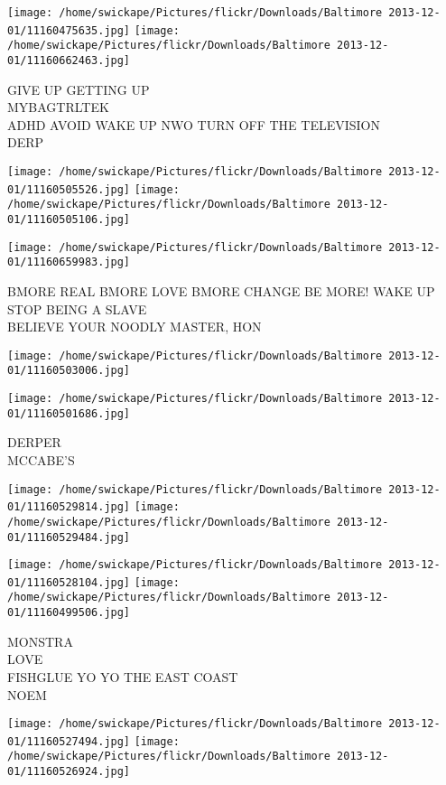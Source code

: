 \documentclass[10pt,letterpaper]{article}
\begin{document}
\texttt{[image: /home/swickape/Pictures/flickr/Downloads/Baltimore 2013-12-01/11160475635.jpg]}
\texttt{[image: /home/swickape/Pictures/flickr/Downloads/Baltimore 2013-12-01/11160662463.jpg]}

GIVE UP GETTING UP\\
MYBAGTRLTEK\\
ADHD AVOID WAKE UP NWO TURN OFF THE TELEVISION\\
DERP
\pagebreak

\texttt{[image: /home/swickape/Pictures/flickr/Downloads/Baltimore 2013-12-01/11160505526.jpg]}
\texttt{[image: /home/swickape/Pictures/flickr/Downloads/Baltimore 2013-12-01/11160505106.jpg]}

\vspace{0.25in}
\texttt{[image: /home/swickape/Pictures/flickr/Downloads/Baltimore 2013-12-01/11160659983.jpg]}

BMORE REAL BMORE LOVE BMORE CHANGE BE MORE! WAKE UP\\
STOP BEING A SLAVE\\
BELIEVE YOUR NOODLY MASTER, HON
\pagebreak

\texttt{[image: /home/swickape/Pictures/flickr/Downloads/Baltimore 2013-12-01/11160503006.jpg]}

\vspace{0.25in}
\texttt{[image: /home/swickape/Pictures/flickr/Downloads/Baltimore 2013-12-01/11160501686.jpg]}

DERPER\\
MCCABE'S
\pagebreak

\texttt{[image: /home/swickape/Pictures/flickr/Downloads/Baltimore 2013-12-01/11160529814.jpg]}
\texttt{[image: /home/swickape/Pictures/flickr/Downloads/Baltimore 2013-12-01/11160529484.jpg]}

\texttt{[image: /home/swickape/Pictures/flickr/Downloads/Baltimore 2013-12-01/11160528104.jpg]}
\texttt{[image: /home/swickape/Pictures/flickr/Downloads/Baltimore 2013-12-01/11160499506.jpg]}

MONSTRA\\
LOVE\\
FISHGLUE YO YO THE EAST COAST\\
NOEM
\pagebreak

\texttt{[image: /home/swickape/Pictures/flickr/Downloads/Baltimore 2013-12-01/11160527494.jpg]}
\texttt{[image: /home/swickape/Pictures/flickr/Downloads/Baltimore 2013-12-01/11160526924.jpg]}
\end{document}
